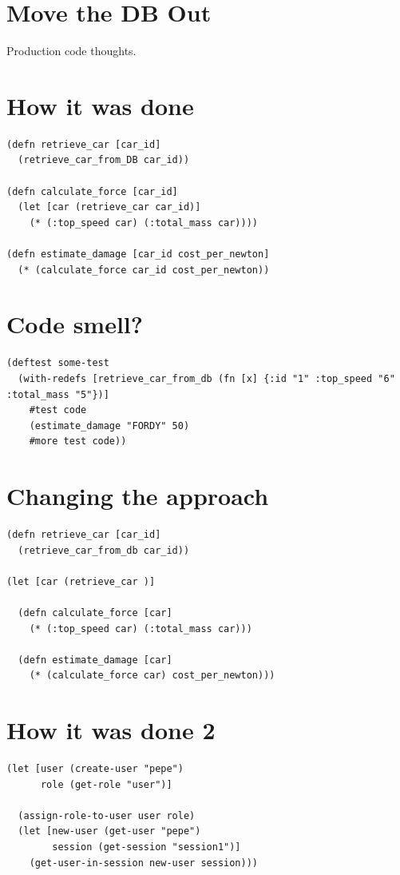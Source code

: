 \documentclass[11pt]{article}
\author{Jorge}
\date{\today}
\title{}
\begin{document}
\tableofcontents

\section{Move the DB Out}
\label{sec:orgfa498c8}

Production code thoughts.

\section{How it was done}
\label{sec:org4d5e4fb}
\begin{verbatim}
(defn retrieve_car [car_id] 
  (retrieve_car_from_DB car_id))

(defn calculate_force [car_id]
  (let [car (retrieve_car car_id)]
    (* (:top_speed car) (:total_mass car))))

(defn estimate_damage [car_id cost_per_newton]
  (* (calculate_force car_id cost_per_newton))

\end{verbatim}

\section{Code smell?}
\label{sec:org930f1cb}
\begin{verbatim}
(deftest some-test 
  (with-redefs [retrieve_car_from_db (fn [x] {:id "1" :top_speed "6" :total_mass "5"})]
    #test code
    (estimate_damage "FORDY" 50)
    #more test code))

\end{verbatim}

\section{Changing the approach}
\label{sec:orgc5efa6e}
\begin{verbatim}
(defn retrieve_car [car_id] 
  (retrieve_car_from_db car_id))

(let [car (retrieve_car )]

  (defn calculate_force [car]
    (* (:top_speed car) (:total_mass car)))

  (defn estimate_damage [car]
    (* (calculate_force car) cost_per_newton)))

\end{verbatim}

\section{How it was done 2}
\label{sec:orga004f5b}
\begin{verbatim}
(let [user (create-user "pepe")
      role (get-role "user")]

  (assign-role-to-user user role)
  (let [new-user (get-user "pepe")
        session (get-session "session1")]
    (get-user-in-session new-user session)))

\end{verbatim}
\end{document}
